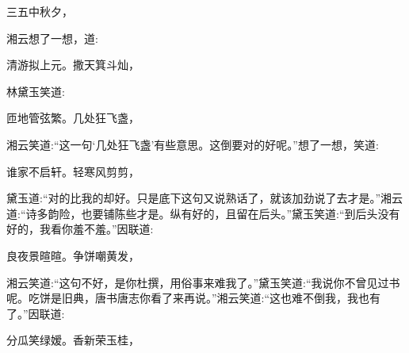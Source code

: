 \begin{poem}
    \begin{pl}三五中秋夕，\end{pl}
\end{poem}


\begin{parag}
    湘云想了一想，道:
\end{parag}


\begin{poem}
    \begin{pl} 清游拟上元。撒天箕斗灿，\end{pl}
\end{poem}


\begin{parag}
    林黛玉笑道:
\end{parag}


\begin{poem}
    \begin{pl}匝地管弦繁。几处狂飞盏，\end{pl}
\end{poem}


\begin{parag}
    湘云笑道:“这一句‘几处狂飞盏’有些意思。这倒要对的好呢。”想了一想，笑道:
\end{parag}


\begin{poem}
    \begin{pl}谁家不启轩。轻寒风剪剪，\end{pl}
\end{poem}


\begin{parag}
    黛玉道:“对的比我的却好。只是底下这句又说熟话了，就该加劲说了去才是。”湘云道:“诗多韵险，也要铺陈些才是。纵有好的，且留在后头。”黛玉笑道:“到后头没有好的，我看你羞不羞。”因联道:
\end{parag}


\begin{poem}
    \begin{pl}良夜景暄暄。争饼嘲黄发，\end{pl}
\end{poem}


\begin{parag}
    湘云笑道:“这句不好，是你杜撰，用俗事来难我了。”黛玉笑道:“我说你不曾见过书呢。吃饼是旧典，唐书唐志你看了来再说。”湘云笑道:“这也难不倒我，我也有了。”因联道:
\end{parag}


\begin{poem}
    \begin{pl}分瓜笑绿嫒。香新荣玉桂，\end{pl}
\end{poem}


